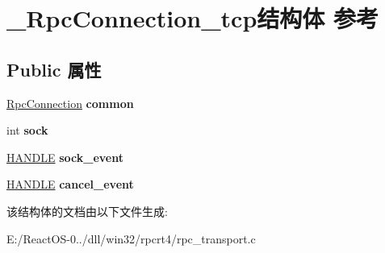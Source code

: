 \hypertarget{struct___rpc_connection__tcp}{}\section{\+\_\+\+Rpc\+Connection\+\_\+tcp结构体 参考}
\label{struct___rpc_connection__tcp}
\subsection*{Public 属性}
\begin{DoxyCompactItemize}
\item 
\mbox{\label{struct___rpc_connection__tcp_a370ce0c9db4c9ef430e59a1b87f8b32b}} 
\hyperlink{struct___rpc_connection}{Rpc\+Connection} {\bfseries common}
\item 
\mbox{\label{struct___rpc_connection__tcp_a5b9c8ad2030ff3e764d9ccb422760176}} 
int {\bfseries sock}
\item 
\mbox{\label{struct___rpc_connection__tcp_ac8691c31b5f18bffb1aee1f6ed82aba1}} 
\hyperlink{interfacevoid}{H\+A\+N\+D\+LE} {\bfseries sock\+\_\+event}
\item 
\mbox{\label{struct___rpc_connection__tcp_a8e7aefbc41c97a720e4745f74034bde6}} 
\hyperlink{interfacevoid}{H\+A\+N\+D\+LE} {\bfseries cancel\+\_\+event}
\end{DoxyCompactItemize}


该结构体的文档由以下文件生成\+:\begin{DoxyCompactItemize}
\item 
E\+:/\+React\+O\+S-\/0../dll/win32/rpcrt4/rpc\+\_\+transport.\+c\end{DoxyCompactItemize}
